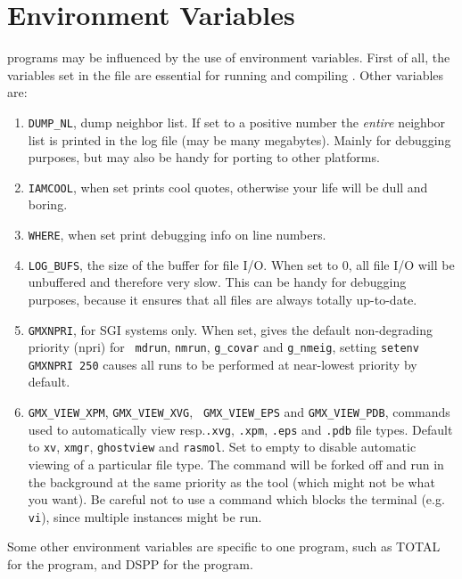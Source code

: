 \section{Environment Variables}
{\gromacs} programs may be influenced by the use of environment 
variables. First of all, the variables set in the  file
are essential for running and compiling {\gromacs}. Other variables are:
\begin{enumerate}
\item	{\tt DUMP\_NL}, dump neighbor list. 
	If set to a positive number the {\em entire}
	neighbor list is printed in the log file (may be many megabytes).
	Mainly for debugging purposes, but may also be handy for
	porting to other platforms.
\item	{\tt IAMCOOL}, when set prints cool quotes, otherwise
	your {\gromacs} life will be dull and boring.
\item	{\tt WHERE}, when set print debugging info on line numbers.
\item	{\tt LOG\_BUFS}, the size of the buffer for file I/O. When set
	to 0, all file I/O will be unbuffered and therefore very slow.
	This can be handy for debugging purposes, because it ensures
	that all files are always totally up-to-date.
\item   {\tt GMXNPRI}, for SGI systems only. When set, gives the
	default non-degrading priority (npri) for {\tt
	mdrun}, {\tt nmrun}, {\tt g\_covar} and {\tt g\_nmeig},
	{\eg}\@ setting \verb'setenv GMXNPRI 250' causes all
	runs to be performed at near-lowest priority by default.
\item	{\tt GMX\_VIEW\_XPM}, {\tt GMX\_VIEW\_XVG}, {\tt
	GMX\_VIEW\_EPS} and {\tt GMX\_VIEW\_PDB}, commands used to
	automatically view resp.\@ {\tt .xvg}, {\tt .xpm}, {\tt .eps}
	and {\tt .pdb} file types. Default to {\tt xv}, {\tt xmgr},
	{\tt ghostview} and {\tt rasmol}. Set to empty to disable
	automatic viewing of a particular file type. The command will
	be forked off and run in the background at the same priority
	as the {\gromacs} tool (which might not be what you want).
	Be careful not to use a command which blocks the terminal
	(e.g. {\tt vi}), since multiple instances might be run.
\end{enumerate}

Some other environment variables are specific to one program, such as
TOTAL for the {\tt {}} program, and DSPP for the
{\tt {}} program.

